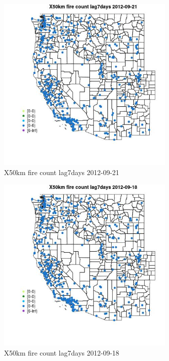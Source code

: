 \begin{figure} 
\centering  
\includegraphics[width=0.77\textwidth]{Code_Outputs/Report_ML_input_PM25_Step4_part_e_de_duplicated_aves_compiled_2019-05-14wNAs_MapObsX50km_fire_count_lag7days2012-09-21.jpg} 
\caption{\label{fig:Report_ML_input_PM25_Step4_part_e_de_duplicated_aves_compiled_2019-05-14wNAsMapObsX50km_fire_count_lag7days2012-09-21}X50km fire count lag7days 2012-09-21} 
\end{figure} 
 

\begin{figure} 
\centering  
\includegraphics[width=0.77\textwidth]{Code_Outputs/Report_ML_input_PM25_Step4_part_e_de_duplicated_aves_compiled_2019-05-14wNAs_MapObsX50km_fire_count_lag7days2012-09-18.jpg} 
\caption{\label{fig:Report_ML_input_PM25_Step4_part_e_de_duplicated_aves_compiled_2019-05-14wNAsMapObsX50km_fire_count_lag7days2012-09-18}X50km fire count lag7days 2012-09-18} 
\end{figure} 
 

